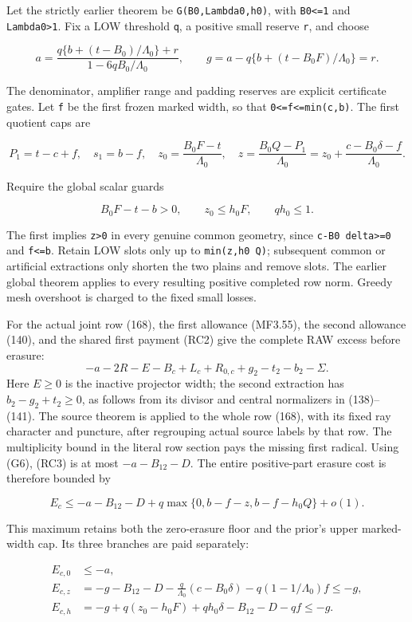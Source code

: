 Let the strictly earlier theorem be \texttt{G(B0,Lambda0,h0)}, with \texttt{B0\textless{}=1} and \texttt{Lambda0\textgreater{}1}. Fix a LOW threshold \texttt{q}, a positive small reserve \texttt{r}, and choose

\[
 a=\frac{q\{b+(t-B_0)/\Lambda_0\}+r}
              {1-6qB_0/\Lambda_0},\qquad
 g=a-q\{b+(t-B_0F)/\Lambda_0\}=r.
\tag{G9}
\]

The denominator, amplifier range and padding reserves are explicit certificate gates. Let \texttt{f} be the first frozen marked width, so that \texttt{0\textless{}=f\textless{}=min(c,b)}. The first quotient caps are

\[
 P_1=t-c+f,\quad s_1=b-f,\quad
 z_0=\frac{B_0F-t}{\Lambda_0},\quad
 z=\frac{B_0Q-P_1}{\Lambda_0}
   =z_0+\frac{c-B_0\delta-f}{\Lambda_0}.
\tag{G10}
\]

Require the global scalar guards

\[
 B_0F-t-b>0,\qquad z_0\le h_0F,
 \qquad qh_0\le1.
\tag{G11}
\]

The first implies \texttt{z\textgreater{}0} in every genuine common geometry, since \texttt{c-B0\ delta\textgreater{}=0} and \texttt{f\textless{}=b}. Retain LOW slots only up to \texttt{min(z,h0\ Q)}; subsequent common or artificial extractions only shorten the two plains and remove slots. The earlier global theorem applies to every resulting positive completed row norm. Greedy mesh overshoot is charged to the fixed small losses.

For the actual joint row (168), the first allowance (MF3.55), the second allowance (140), and the shared first payment (RC2) give the complete RAW excess before erasure: \[
 -a-2R-E-B_c+L_c+R_{0,c}+g_2-t_2-b_2-\Sigma.
 \tag{RC3}
\] Here \(E\ge0\) is the inactive projector width; the second extraction has \(b_2-g_2+t_2\ge0\), as follows from its divisor and central normalizers in (138)--(141). The source theorem is applied to the whole row (168), with its fixed ray character and puncture, after regrouping actual source labels by that row. The multiplicity bound in the literal row section pays the missing first radical. Using (G6), (RC3) is at most \(-a-B_{12}-D\). The entire positive-part erasure cost is therefore bounded by

\[
 E_c\le-a-B_{12}-D
    +q\max\{0,b-f-z,b-f-h_0Q\}+o(1).
\tag{G12}
\]

This maximum retains both the zero-erasure floor and the prior's upper marked-width cap. Its three branches are paid separately:

\[
 \begin{aligned}
 E_{c,0}&\le-a,\\
 E_{c,z}&=-g-B_{12}-D-\frac q{\Lambda_0}(c-B_0\delta)
             -q(1-1/\Lambda_0)f\le-g,\\
 E_{c,h}&=-g+q(z_0-h_0F)+qh_0\delta-B_{12}-D-qf
             \le-g.
 \end{aligned}
\tag{G13}
\]

